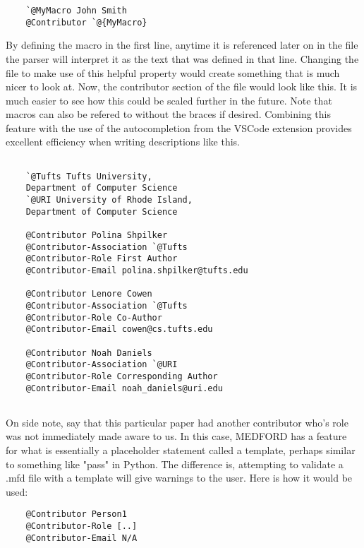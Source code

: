 \documentclass[]{article}%
\begin{document}
\begin{small}
\begin{verbatim}
    `@MyMacro John Smith
    @Contributor `@{MyMacro}
\end{verbatim}
\end{small}
By defining the macro in the first line, anytime it is referenced later on in the file the parser will interpret it as the text that was defined in that line. Changing the file to make use of this helpful property would create something that is much nicer to look at. Now, the contributor section of the file would look like this. It is much easier to see how this could be scaled further in the future. Note that macros can also be refered to without the braces if desired. Combining this feature with the use of the autocompletion from the VSCode extension provides excellent efficiency when writing descriptions like this.
\begin{small}
\begin{verbatim}
    
    `@Tufts Tufts University,
    Department of Computer Science
    `@URI University of Rhode Island,
    Department of Computer Science
    
    @Contributor Polina Shpilker
    @Contributor-Association `@Tufts
    @Contributor-Role First Author
    @Contributor-Email polina.shpilker@tufts.edu
    
    @Contributor Lenore Cowen
    @Contributor-Association `@Tufts
    @Contributor-Role Co-Author
    @Contributor-Email cowen@cs.tufts.edu
    
    @Contributor Noah Daniels
    @Contributor-Association `@URI
    @Contributor-Role Corresponding Author
    @Contributor-Email noah_daniels@uri.edu
    
\end{verbatim}
\end{small}

On side note, say that this particular paper had another contributor who's role was not immediately made aware to us. In this case, MEDFORD has a feature for what is essentially a placeholder statement called a template, perhaps similar to something like "pass" in Python. The difference is, attempting to validate a .mfd file with a template will give warnings to the user. Here is how it would be used:

\begin{small}
\begin{verbatim}
    @Contributor Person1
    @Contributor-Role [..]
    @Contributor-Email N/A
\end{verbatim}
\end{small}
\end{document}
